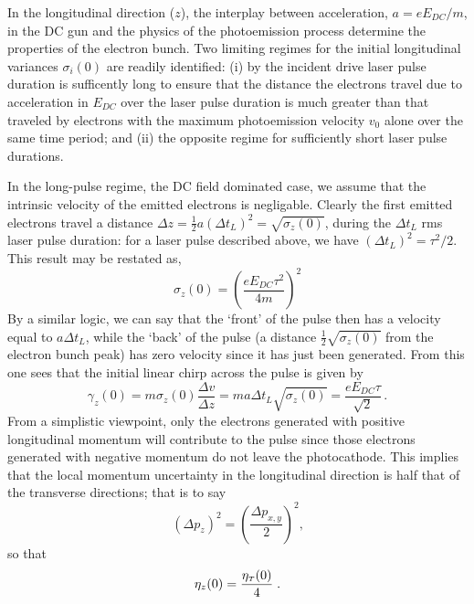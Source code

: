 In the longitudinal direction ($z$), the interplay between acceleration, $ a = e E_{DC}/m $, in the DC gun and the physics of the photoemission process determine the properties of the electron bunch.
Two limiting regimes for the initial longitudinal variances $ \sigma_{i} ( 0 ) $ are readily identified: (i) by the incident drive laser pulse duration is sufficently long to ensure that the distance the electrons travel due to acceleration in $ E_{DC} $ over the laser pulse duration is much greater than that traveled by electrons with the maximum photoemission velocity $ v_{0} $ alone over the same time period; and (ii) the opposite regime for sufficiently short laser pulse durations.

In the long-pulse regime, the DC field dominated case, we assume that the intrinsic velocity of the emitted electrons is negligable.
Clearly the first emitted electrons travel a distance $ \Delta z = \frac{ 1 }{ 2 } a ( \Delta t_{L} )^{ 2 } = \sqrt{ \sigma_{ z } ( 0 ) } $, during the  $ \Delta t_{ L } $ rms laser pulse duration: for a laser pulse described above, we have $ ( \Delta t_{L} )^{ 2 } = \tau^{ 2 } / 2 $.
This result may be restated as,
\begin{equation}
  \sigma_{ z } ( 0 ) = \left ( \frac{ e E_{ DC } \tau^{ 2 } }{ 4 m } \right )^{ 2 }
\end{equation}
By a similar logic, we can say that the `front' of the pulse then has a velocity equal to $ a \Delta t_{ L } $, while the `back' of the pulse (a distance $ \frac{ 1 }{ 2 } \sqrt{ \sigma_{ z } ( 0 ) } $ from the electron bunch peak) has zero velocity since it has just been generated. From this one sees that the initial linear chirp across the pulse is given by 
\begin{equation}
  \gamma_{ z } ( 0 ) = m \sigma_{ z } ( 0 ) \frac{ \Delta v }{ \Delta z } = m a \Delta t_{ L } \sqrt{ \sigma_{ z } ( 0 ) } = \frac{ e E_{ DC } \tau }{ \sqrt{ 2 } }\, .
\end{equation} 
From a simplistic viewpoint, only the electrons generated with positive longitudinal momentum will contribute to the pulse since those electrons generated with negative momentum do not leave the photocathode.
This implies that the local momentum uncertainty in the longitudinal direction is half that of the transverse directions; that is to say
\begin{equation}
( \Delta p_{ z } )^{2} = \left ( \frac{\Delta p_{ x , y }}{ 2 } \right )^{2} \text{,}
\end{equation}
so that
\begin{equation}
\eta_{ z } ( 0 ) = \frac{ \eta_{ {\scriptscriptstyle T} } ( 0 )}{ 4 } \; \text{.}
\end{equation}

